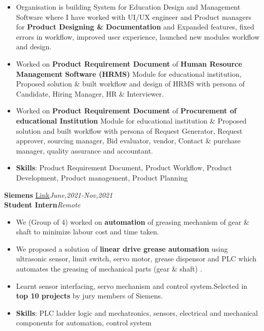 \documentclass[10pt]{extarticle}
\begin{document}
    \begin{itemize}
       \item Organisation is building System for Education Design and Management Software where I have worked with UI/UX engineer and Product managers for \textbf{Product Designing \& Documentation} and Expanded features, fixed errors in workflow, improved user experience, launched new modules workflow and design.
       \item Worked on \textbf{Product Requirement Document} of \textbf{Human Resource Management Software (HRMS)} Module for educational institution, Proposed solution \& built workflow and design of HRMS with persona of Candidate, Hiring Manager, HR \& Interviewer.
       \item Worked on \textbf{Product Requirement Document} of \textbf{Procurement of educational Institution} Module for educational institution \&  Proposed solution and built workflow with persona of Request Generator, Request approver, sourcing manager, Bid evaluator, vendor, Contact \& purchase manager, quality assurance and accountant.
       \item \textbf{Skills}: Product Requirement Document, Product Workflow, Product Development, Product management, Product Planning
    \end{itemize}
\vspace{5pt}
\textbf{Siemens}  \href{https://github.com/PSoni8/Siemens-2021-2022-Internship}{\underline{Link}}\hfill\hfill\textit{June,2021-Nov,2021}\\
\textbf{Student Intern}\hfill\hfill\textit{Remote}
     \begin{itemize}
         \item We (Group of 4) worked on \textbf{automation} of greasing mechanism of gear \& shaft to minimize labour cost and time taken.
         \item We proposed a solution of \textbf{linear drive grease automation} using ultrasonic sensor, limit switch, servo motor, grease dispensor and PLC which automates the greasing of mechanical parts (gear \& shaft) . 
         \item Learnt sensor interfacing, servo mechanism and control system.Selected in \textbf{top 10 projects} by jury members of Siemens.
         \item \textbf{Skills}: PLC ladder logic and mechatronics, sensors, electrical and mechanical components for automation, control system
     \end{itemize}
\vspace{5pt}
\end{document}
